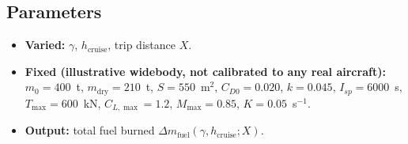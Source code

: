 \subsection{Parameters}
\begin{itemize}
  \item \textbf{Varied:} $\gamma$, $h_{\text{cruise}}$, trip distance $X$.
  \item \textbf{Fixed (illustrative widebody, not calibrated to any real aircraft):}
        $m_0 = 400$~t, $m_{\text{dry}} = 210$~t, $S = 550$~m$^2$, $C_{D0}=0.020$, $k=0.045$, $I_{sp}=6000$~s,
        $T_{\max}=600$~kN, $C_{L,\max}=1.2$, $M_{\max}=0.85$, $K = 0.05$~s$^{-1}$.
  \item \textbf{Output:} total fuel burned $\Delta m_{\text{fuel}}(\gamma,h_{\text{cruise}};X)$.
\end{itemize}
